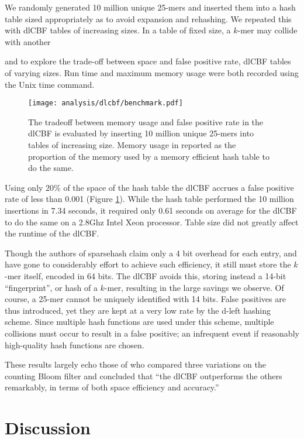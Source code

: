 \documentclass[twocolumn]{article}
\begin{document}
We randomly generated 10 million unique 25-mers and inserted them into a hash
table sized appropriately as to avoid expansion and rehashing. We repeated
this with dlCBF tables of increasing sizes. In a table of fixed size, a
$k$-mer may collide with another



 and to explore
the trade-off between space and false positive rate, dlCBF tables of varying
sizes. Run time and maximum memory usage were both recorded using the Unix
time command.

\begin{figure}[h]
\centerline{\texttt{[image: analysis/dlcbf/benchmark.pdf]}}
\caption{
The tradeoff between memory usage and false positive rate in the dlCBF is
evaluated by inserting 10 million unique 25-mers into tables of increasing
size. Memory usage in reported as the proportion of the memory used by a
memory efficient hash table to do the same.
}
\label{fig:dlcbf_bench}
\end{figure}

Using only 20\% of the space of the hash table the dlCBF accrues a false
positive rate of less than 0.001 (Figure \ref{fig:dlcbf_bench}). While the
hash table performed the 10 million insertions in 7.34 seconds, it required
only 0.61 seconds on average for the dlCBF to do the same on a 2.8Ghz Intel
Xeon processor. Table size did not greatly affect the runtime of the dlCBF.

Though the authors of sparsehash claim only a 4 bit overhead for each entry,
and have gone to considerably effort to achieve such efficiency, it still must
store the $k$-mer itself, encoded in 64 bits. The dlCBF avoids this, storing
instead a 14-bit ``fingerprint'', or hash of a $k$-mer, resulting in the large
savings we observe. Of course, a 25-mer cannot be uniquely identified with 14
bits. False positives are thus introduced, yet they are kept at a very low
rate by the d-left hashing scheme. Since multiple hash functions are used
under this scheme, multiple collisions must occur to result in a false
positive; an infrequent event if reasonably high-quality hash functions are
chosen.

These results largely echo those of \citet{Zhang2009} who compared three
variations on the counting Bloom filter and concluded that ``the dlCBF
outperforms the others remarkably, in terms of both space efficiency and
accuracy.''

\section{Discussion}



\end{document}
